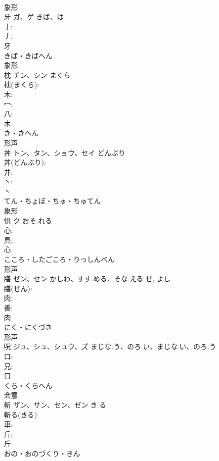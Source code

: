 \documentclass[8pt]{extreport}
\begin{document}
\begin{CJK}{UTF8}{min}
\\	象形 
\\	牙	ガ、ゲ	きば、は		
\\	亅: 
\\	丿: 
\\	牙	
\\	きば・きばへん	
\\	象形 
\\	枕	チン、シン	まくら		
\\	枕(まくら): 
\\	木: 
\\	冖: 
\\	八: 
\\	木	
\\	き・きへん	
\\	形声 
\\	丼	トン、タン、ショウ、セイ	どんぶり		
\\	丼(どんぶり): 
\\	井: 
\\	丶: 
\\	丶	
\\	てん・ちょぼ・ちゅ・ちゅてん	
\\	象形 
\\	惧	ク	おそ.れる		
\\	心: 
\\	具: 
\\	心	
\\	こころ・したごころ・りっしんべん	
\\	形声 
\\	膳	ゼン、セン	かしわ、すす.める、そな.える	ぜ, よし	
\\	膳(ぜん): 
\\	肉: 
\\	善: 
\\	肉	
\\	にく・にくづき	
\\	形声 
\\	呪	ジュ、シュ、シュウ、ズ	まじな.う、のろ.い、まじな.い、のろ.う		
\\	口: 
\\	兄: 
\\	口	
\\	くち・くちへん	
\\	会意 
\\	斬	ザン、サン、セン、ゼン	き.る		
\\	斬る(きる): 
\\	車: 
\\	斤: 
\\	斤	
\\	おの・おのづくり・きん	

\end{CJK}
\end{document}
